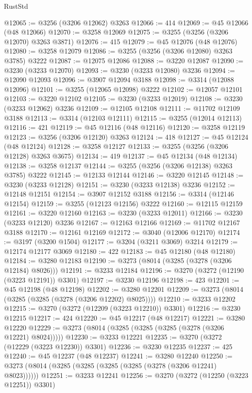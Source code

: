 \begin{lexlean}{RustStd}
\begin{coremodule}
@12065 := @3256 (@3206 @12062) @3263
@12066 := 414
@12069 := @45 @12066 (@48 @12066)
@12070 := @3258 @12069
@12075 := @3255 (@3256 (@3206 @12070) @3263 @3871)
@12076 := 415
@12079 := @45 @12076 (@48 @12076)
@12080 := @3258 @12079
@12086 := @3255 (@3256 (@3206 @12080) @3263 @3785) @3222
@12087 := @12075 @12086
@12088 := @3220 @12087
@12090 := @3230 (@3233 @12070)
@12093 := @3230 (@3233 @12080) @3236
@12094 := @12090 @12093
@12096 := @3907 @12094 @3188
@12098 := @3314 (@12088 @12096)
@12101 := @3255 (@12065 @12098) @3222
@12102 := @12057 @12101
@12103 := @3220 @12102
@12105 := @3230 (@3233 @12019)
@12108 := @3230 (@3233 @12062) @3236
@12109 := @12105 @12108
@12111 := @11702 @12109 @3188
@12113 := @3314 (@12103 @12111)
@12115 := @3255 (@12014 @12113)
@12116 := 421
@12119 := @45 @12116 (@48 @12116)
@12120 := @3258 @12119
@12123 := @3256 (@3206 @12120) @3263
@12124 := 418
@12127 := @45 @12124 (@48 @12124)
@12128 := @3258 @12127
@12133 := @3255 (@3256 (@3206 @12128) @3263 @3675)
@12134 := 419
@12137 := @45 @12134 (@48 @12134)
@12138 := @3258 @12137
@12144 := @3255 (@3256 (@3206 @12138) @3263 @3785) @3222
@12145 := @12133 @12144
@12146 := @3220 @12145
@12148 := @3230 (@3233 @12128)
@12151 := @3230 (@3233 @12138) @3236
@12152 := @12148 @12151
@12154 := @3907 @12152 @3188
@12156 := @3314 (@12146 @12154)
@12159 := @3255 (@12123 @12156) @3222
@12160 := @12115 @12159
@12161 := @3220 @12160
@12163 := @3230 (@3233 @12011)
@12166 := @3230 (@3233 @12120) @3236
@12167 := @12163 @12166
@12169 := @11702 @12167 @3188
@12170 := @12161 @12169
@12172 := @3040 (@12006 @12170)
@12174 := @3197 (@3200 @1504)
@12177 := @3204 (@3211 @3069) @3214
@12179 := @12174 @12177 @3069
@12180 := 422
@12183 := @45 @12180 (@48 @12180)
@12184 := @3280 @12183
@12190 := @3273 (@8014 (@3285 (@3278 (@3206 @12184) @8026)))
@12191 := @3233 @12184
@12196 := @3270 (@3272 (@12190 (@3223 @12191)) @3301)
@12197 := @3230 @12196
@12198 := 423
@12201 := @45 @12198 (@48 @12198)
@12202 := @3280 @12201
@12209 := @3273 (@8014 (@3285 (@3285 (@3278 (@3206 @12202) @8025))))
@12210 := @3233 @12202
@12215 := @3270 (@3272 (@12209 (@3223 @12210)) @3301)
@12216 := @3230 @12215
@12217 := 424
@12220 := @45 @12217 (@48 @12217)
@12221 := @3280 @12220
@12229 := @3273 (@8014 (@3285 (@3285 (@3285 (@3278 (@3206 @12221) @8024)))))
@12230 := @3233 @12221
@12235 := @3270 (@3272 (@12229 (@3223 @12230)) @3301)
@12236 := @3230 @12235
@12237 := 425
@12240 := @45 @12237 (@48 @12237)
@12241 := @3280 @12240
@12250 := @3273 (@8014 (@3285 (@3285 (@3285 (@3285 (@3278 (@3206 @12241) @8023))))))
@12251 := @3233 @12241
@12256 := @3270 (@3272 (@12250 (@3223 @12251)) @3301)

\end{coremodule}
\end{lexlean}
